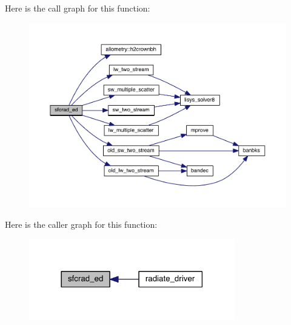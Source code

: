 Here is the call graph for this function\+:\nopagebreak
\begin{figure}[H]
\begin{center}
\leavevmode
\includegraphics[width=350pt]{radiate__driver_8f90_aa7642a6b7c3a9578373f6f05492956ec_cgraph}
\end{center}
\end{figure}




Here is the caller graph for this function\+:\nopagebreak
\begin{figure}[H]
\begin{center}
\leavevmode
\includegraphics[width=254pt]{radiate__driver_8f90_aa7642a6b7c3a9578373f6f05492956ec_icgraph}
\end{center}
\end{figure}


